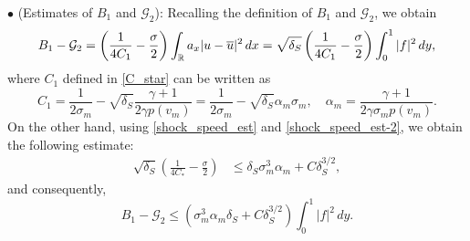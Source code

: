 \documentclass[11pt,reqno]{amsart}
\begin{document}
	\noindent $\bullet$ (Estimates of $B_1$ and  $\mathcal{G}_2$):
	Recalling the definition of $B_1$ and $\mathcal{G}_2$, we obtain
	\begin{align*}
	B_1-\mathcal{G}_2=\left(\frac{1}{4C_1} -\frac{\sigma}{2} \right) \int_\mathbb{R} a_x |u-\overline{u}|^2 \, d x=\sqrt{\delta_S}\left(\frac{1}{4C_1}-\frac{\sigma}{2}\right)\int_0^1 |f|^2\,dy,
	\end{align*}
	where $C_1$ defined in \eqref{C_star} can be written as
	\begin{equation*}
	C_1=\frac{1}{2\sigma_m} -\sqrt{\delta_S}\frac{\gamma+1}{2\gamma p(v_m)}=\frac{1}{2 \sigma_m} -\sqrt{\delta_S}\alpha_m \sigma_m, \quad \alpha_m=\frac{\gamma+1}{2 \gamma \sigma_m p(v_m)}.
	\end{equation*}
	 On the other hand, using \eqref{shock_speed_est} and \eqref{shock_speed_est-2}, we obtain the following estimate:
	\begin{align*}
	\sqrt{\delta_S}\left(\frac{1}{4C_*}-\frac{\sigma}{2}\right)
	&\le  \delta_S\sigma_m^3 \alpha_m  +C \delta_S^{3/2},
	\end{align*}
	and consequently,
	\begin{equation}\label{R1.2}
	B_1-\mathcal{G}_2 \le  \left( \sigma_m^3 \alpha_m \delta_S +C \delta_S^{3/2} \right) \int_0^1 |f|^2 \, dy. 
	\end{equation}
	
\end{document}

